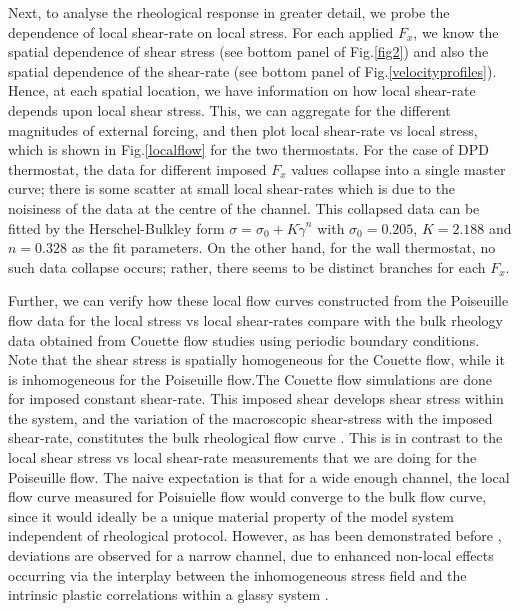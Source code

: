 Next, to analyse the rheological response in greater detail, we probe the dependence of local shear-rate on local stress. For each applied $F_x$, we know the spatial dependence of shear stress (see bottom panel of Fig.\ref{fig2}) and also the spatial dependence of the shear-rate (see bottom panel of Fig.\ref{velocityprofiles}). Hence, at each spatial location, we have information on how local shear-rate depends upon local shear stress. This, we can aggregate for the different magnitudes of external forcing, and then plot local shear-rate vs local stress, which is shown in Fig.\ref{localflow} for the two thermostats. For the case of DPD thermostat, the data for different imposed $F_x$ values collapse into a single master curve; there is some scatter at small local shear-rates which is due to the noisiness of the data at the centre of the channel. This collapsed data can be fitted by the Herschel-Bulkley form $\sigma = \sigma_0 + K\dot{\gamma}^n$ with $\sigma_0 = 0.205$, $K = 2.188$ and $n = 0.328$ as the fit parameters. On the other hand, for the wall thermostat, no such data collapse occurs; rather, there seems to be distinct branches for each $F_x$.

Further, we can verify how these local flow curves constructed from the Poiseuille flow data for the local stress vs local shear-rates compare with the bulk rheology data obtained from Couette flow studies using periodic boundary conditions. Note that the shear stress is spatially homogeneous for the Couette flow, while it is inhomogeneous for the Poiseuille flow.The Couette flow simulations are done for imposed constant shear-rate. This imposed shear develops shear stress within the system, and the variation of the macroscopic shear-stress with the imposed shear-rate, constitutes the bulk rheological flow curve \cite{bonn2017yield}. This is in contrast to the local shear stress vs local shear-rate measurements that we are doing for the Poiseuille flow. The naive expectation is that for a wide enough channel, the local flow curve measured for Poisuielle flow would converge to the bulk flow curve, since it would ideally be a unique material property of the model system independent of rheological protocol. However, as has been demonstrated before \cite{goyon2008spatial, chaudhuri2012dynamical} , deviations are observed for a narrow channel, due to enhanced non-local effects occurring via the interplay between the inhomogeneous stress field and the intrinsic plastic correlations within a glassy system \cite{bocquet2009kinetic}.

